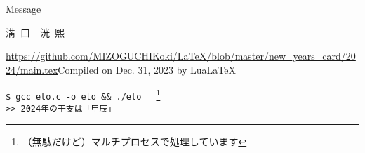 \documentclass[twocolumn,fontsize=9pt]{jlreq}
\begin{document}
\begin{itembox}[l]{\small Message}
    \vspace{1cm}
\end{itembox}
\begin{framed}
    {\scriptsize\noindent}
    \vspace{.5cm}
    \begin{center}
        {\LARGE 溝\ 口\ \  洸\ 熙}
    \end{center}
\end{framed}
\noindent\tiny{\url{https://github.com/MIZOGUCHIKoki/LaTeX/blob/master/new_years_card/2024/main.tex}\hfill Compiled on Dec. 31, 2023 by Lua\LaTeX}
\newpage

\small{\texttt{\$ gcc eto.c -o eto \&\& ./eto }\ \ \footnote{（無駄だけど）マルチプロセスで処理しています}\\
    \texttt{>> 2024年の干支は「甲辰」}}
\end{document}
